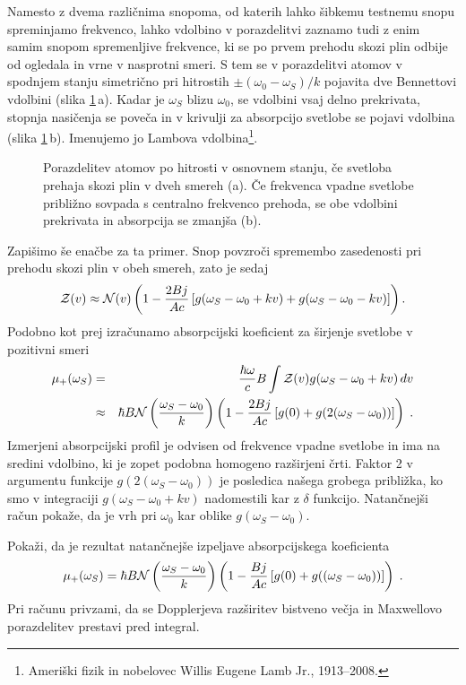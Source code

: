 Namesto z dvema različnima snopoma, od katerih lahko šibkemu testnemu snopu spreminjamo
frekvenco, lahko vdolbino v porazdelitvi zaznamo tudi z enim samim snopom
spremenljive frekvence, ki se po prvem prehodu skozi plin odbije od
ogledala in vrne v nasprotni smeri. S tem se v porazdelitvi atomov
v spodnjem stanju simetrično pri hitrostih $\pm(\omega_{0}-\omega_S)/k$
pojavita dve Bennettovi vdolbini (slika \ref{fig:Lamb}\,a).
Kadar je $\omega_S$ blizu $\omega_{0}$, se vdolbini vsaj delno prekrivata, 
stopnja nasičenja se poveča in v krivulji za absorpcijo svetlobe se pojavi 
vdolbina (slika \ref{fig:Lamb}\,b).
Imenujemo jo Lambova vdolbina\footnote{Ameriški fizik in nobelovec 
Willis Eugene Lamb Jr., 1913--2008.}. 
\begin{figure}[h]
\centering
\def\svgwidth{130truemm} 

\caption{Porazdelitev atomov po hitrosti v osnovnem stanju, če svetloba prehaja 
skozi plin v dveh smereh (a). Če frekvenca vpadne svetlobe približno sovpada s centralno 
frekvenco prehoda, se obe vdolbini prekrivata in absorpcija se zmanjša (b).}
\label{fig:Lamb}
\end{figure}

Zapišimo še enačbe za ta primer. Snop povzroči spremembo zasedenosti
pri prehodu skozi plin v obeh smereh, zato je sedaj 
\begin{equation}
{\cal Z}(v)\approx{\cal N}(v)\left(1-\frac{2Bj}{Ac}\left[g(\omega_S-\omega_{0}+kv)+
g(\omega_S-\omega_{0}-kv)\right]\right).
\label{4.92}
\end{equation}
Podobno kot prej izračunamo absorpcijski koeficient za širjenje svetlobe v
pozitivni smeri 
\begin{eqnarray}
\mu_{+}(\omega_S) & = & \frac{\hbar\omega}{c}B\int{\cal Z}(v)g(\omega_S-\omega_{0}+kv)\, dv\nonumber \\
 & \approx & \hbar B{\cal N}\left(\frac{\omega_S-\omega_0}{k}\right)\left(1-\frac{2Bj}
 {Ac}\left[g(0)+g(2(\omega_S-\omega_{0}))\right]\right)\;.
 \label{eq:lamb}
\end{eqnarray}
Izmerjeni absorpcijski profil je odvisen od frekvence vpadne svetlobe in ima na sredini vdolbino,
ki je zopet podobna homogeno razširjeni črti. Faktor 2 v argumentu
funkcije $g(2(\omega_S-\omega_{0}))$ je posledica našega grobega približka,
ko smo v integraciji $g(\omega_S-\omega_{0}+kv)$ nadomestili kar z
$\delta$ funkcijo. Natančnejši račun pokaže, da je vrh pri $\omega_{0}$
kar oblike $g(\omega_S-\omega_{0})$.

\begin{definition}
Pokaži, da je rezultat natančnejše izpeljave absorpcijskega koeficienta  
\begin{equation}
 \mu_{+}(\omega_S) = \hbar B{\cal N}\left(\frac{\omega_S-\omega_0}{k}\right)\left(1-\frac{Bj}
 {Ac}\left[g(0)+g((\omega_S-\omega_{0}))\right]\right)\;.
\end{equation}
Pri računu privzami, da se Dopplerjeva razširitev bistveno večja in Maxwellovo porazdelitev
prestavi pred integral. 
\end{definition}

